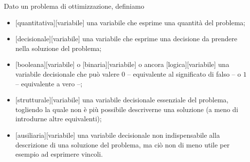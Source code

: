 \begin{Definition}
	Dato un problema di ottimizzazione, definiamo
	\begin{itemize}
		\item {}[quantitativa][variabile] una variabile che esprime una quantit\`a del problema;
		\item {}[decisionale][variabile] una variabile che esprime una decisione da prendere nella soluzione del problema;
		\item {}[booleana][variabile] o [binaria][variabile] o ancora [logica][variabile] una variabile decisionale che pu\`o valere $0$ -- equivalente al significato di falso -- o $1$ -- equivalente a vero --;
		\item {}[strutturale][variabile] una variabile decisionale essenziale del problema, togliendo la quale non \`e pi\`u possibile descriverne una soluzione (a meno di introdurne altre equivalenti);
		\item {}[ausiliaria][variabile] una variabile decisionale non indispensabile alla descrizione di una soluzione del problema, ma ci\`o non di meno utile per esempio ad esprimere vincoli.
	\end{itemize}
\end{Definition}
